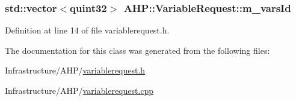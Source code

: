 \subsubsection[{m\+\_\+vars\+Id}]{\setlength{\rightskip}{0pt plus 5cm}std\+::vector$<$quint32$>$ A\+H\+P\+::\+Variable\+Request\+::m\+\_\+vars\+Id\hspace{0.3cm}{\ttfamily [protected]}}\label{class_a_h_p_1_1_variable_request_a4bc80cb39c5d8778765de922dce4ebae}


Definition at line 14 of file variablerequest.\+h.



The documentation for this class was generated from the following files\+:\begin{DoxyCompactItemize}
\item 
Infrastructure/\+A\+H\+P/\hyperlink{variablerequest_8h}{variablerequest.\+h}\item 
Infrastructure/\+A\+H\+P/\hyperlink{variablerequest_8cpp}{variablerequest.\+cpp}\end{DoxyCompactItemize}
